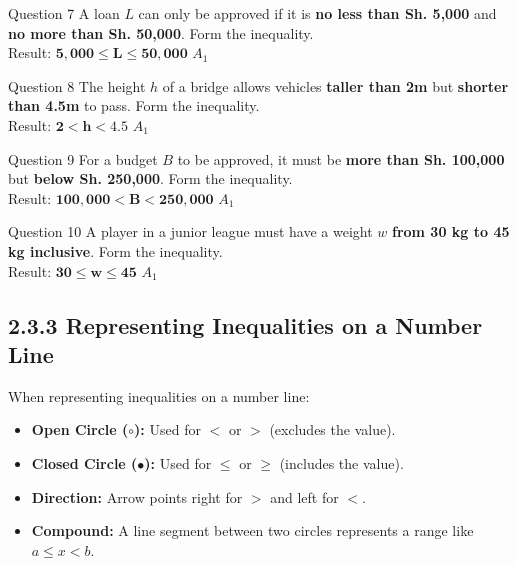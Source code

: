 \documentclass[12pt, a4paper, oneside]{article}
\begin{document}
\begin{solvingbox}{Question 7}
A loan $L$ can only be approved if it is \textbf{no less than Sh. 5,000} and \textbf{no more than Sh. 50,000}. Form the inequality. \\
Result: $\mathbf{5,000 \leq L \leq 50,000}$ \hfill $A_1$
\end{solvingbox}

\begin{solvingbox}{Question 8}
The height $h$ of a bridge allows vehicles \textbf{taller than 2m} but \textbf{shorter than 4.5m} to pass. Form the inequality. \\
Result: $\mathbf{2 < h < 4.5}$ \hfill $A_1$
\end{solvingbox}

\begin{solvingbox}{Question 9}
For a budget $B$ to be approved, it must be \textbf{more than Sh. 100,000} but \textbf{below Sh. 250,000}. Form the inequality. \\
Result: $\mathbf{100,000 < B < 250,000}$ \hfill $A_1$
\end{solvingbox}

\begin{solvingbox}{Question 10}
A player in a junior league must have a weight $w$ \textbf{from 30 kg to 45 kg inclusive}. Form the inequality. \\
Result: $\mathbf{30 \leq w \leq 45}$ \hfill $A_1$
\end{solvingbox}
\newpage

\subsection*{2.3.3 Representing Inequalities on a Number Line}

\begin{tcolorbox}[colback=lightgrey, colframe=primaryblue, title=\textbf{Teacher's Concept: Number Line Rules}, arc=5pt]
    When representing inequalities on a number line:
    \begin{itemize}
        \item \textbf{Open Circle ($\circ$):} Used for $<$ or $>$ (excludes the value).
        \item \textbf{Closed Circle ($\bullet$):} Used for $\leq$ or $\geq$ (includes the value).
        \item \textbf{Direction:} Arrow points right for $>$ and left for $<$.
        \item \textbf{Compound:} A line segment between two circles represents a range like $a \leq x < b$.
    \end{itemize}
\end{tcolorbox}
\end{document}
